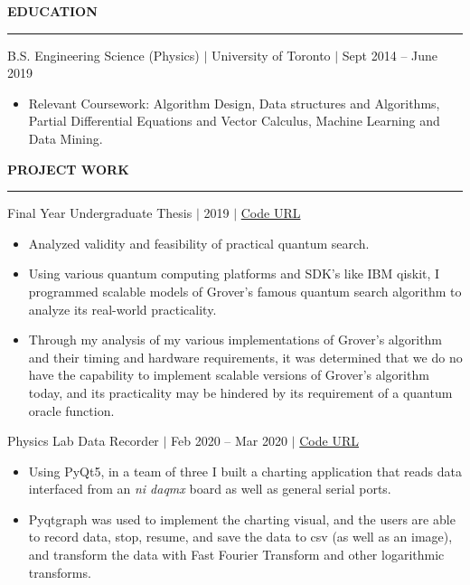 \documentclass[12pt]{article}
\newcommand{\sectionRule}{\textcolor{gray}{\rule{7.27in}{0.02cm}}}
\newcommand{\sectionTxt}[1]{\noindent\textbf{#1}\\}
\newcommand{\textDate}[3]{\noindent#1 $|$ #2 $|$ {\color{textGray} #3}}
\begin{document}
    \sectionTxt{EDUCATION}
    \sectionRule

    \textDate{B.S. Engineering Science (Physics)}{University of Toronto}{Sept 2014 -- June 2019}
    \begin{small}
        \begin{itemize}
            \itemsep0em 
            \item Relevant Coursework: {\color{textGray} Algorithm Design, Data structures and Algorithms, Partial Differential Equations and Vector Calculus, Machine Learning and Data Mining.}
        \end{itemize}
    \end{small}

    \sectionTxt{PROJECT WORK}
    \sectionRule

    \textDate{Final Year Undergraduate Thesis}{2019}{\href{https://github.com/Sammyalhashe/Thesis/tree/master/Grover}{Code URL}}
    \begin{small}
        \begin{itemize}
            \itemsep0em 
            \item {\color{textGray} Analyzed validity and feasibility of practical quantum search.}
            \item {\color{textGray} Using various quantum computing platforms and SDK's like IBM qiskit, I programmed scalable models of Grover's famous quantum search algorithm to analyze its real-world practicality.}
            \item {\color{textGray} Through my analysis of my various implementations of Grover's algorithm and their timing and hardware requirements, it was determined that we do no have the capability to implement scalable versions of Grover's algorithm today, and its practicality may be hindered by its requirement of a quantum oracle function.}
        \end{itemize}
    \end{small}

    \textDate{Physics Lab Data Recorder}{Feb 2020 -- Mar 2020}{\href{https://github.com/Sammyalhashe/Charter-cp}{Code URL}}
    \begin{small}
        \begin{itemize}
            \itemsep0em 
            \item {\color{textGray} Using PyQt5, in a team of three I built a charting application that reads data interfaced from an \textit{ni daqmx} board as well as general serial ports.}
            \item {\color{textGray} Pyqtgraph was used to implement the charting visual, and the users are able to record data, stop, resume, and save the data to csv (as well as an image), and transform the data with Fast Fourier Transform and other logarithmic transforms.}
        \end{itemize}
    \end{small}
\end{document}
